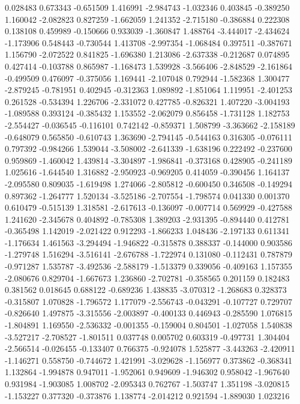 0.028483
0.673343
-0.651509
1.416991
-2.984743
-1.032346
0.403845
-0.389250
1.160042
-2.082823
0.827259
-1.662059
1.241352
-2.715180
-0.386884
0.222308
0.138108
0.459989
-0.150666
0.933039
-1.360847
1.488764
-3.444017
-2.434624
-1.173906
0.548443
-0.730544
1.413708
-2.997354
-1.068484
0.397511
-0.387671
1.156790
-2.072522
0.841825
-1.696380
1.213086
-2.637338
-0.212687
0.074895
0.427414
-0.103788
0.865987
-1.168473
1.539928
-3.566406
-2.848529
-2.161864
-0.499509
0.476097
-0.375056
1.169441
-2.107048
0.792944
-1.582368
1.300477
-2.879245
-0.781951
0.402945
-0.312363
1.089892
-1.851064
1.119951
-2.401253
0.261528
-0.534394
1.226706
-2.331072
0.427785
-0.826321
1.407220
-3.004193
-1.089588
0.393124
-0.385432
1.153552
-2.062079
0.856458
-1.731128
1.182753
-2.554427
-0.036545
-0.116101
0.742142
-0.859371
1.508799
-3.363662
-2.158189
-0.648079
0.565850
-0.610743
1.363690
-2.794145
-0.544163
0.316305
-0.076111
0.797392
-0.984266
1.539044
-3.508002
-2.641339
-1.638196
0.222492
-0.237600
0.959869
-1.460042
1.439814
-3.304897
-1.986841
-0.373168
0.428905
-0.241189
1.025616
-1.644540
1.316882
-2.950923
-0.969205
0.414059
-0.390456
1.164137
-2.095580
0.809035
-1.619498
1.274066
-2.805812
-0.600450
0.346508
-0.149294
0.897362
-1.264777
1.520134
-3.525186
-2.707554
-1.798574
0.041330
0.001370
0.610479
-0.515139
1.318581
-2.617613
-0.136097
-0.007714
0.569929
-0.427588
1.241620
-2.345678
0.404892
-0.785308
1.389203
-2.931395
-0.894440
0.412781
-0.365498
1.142019
-2.021422
0.912293
-1.866233
1.048436
-2.197133
0.611341
-1.176634
1.461563
-3.294494
-1.946822
-0.315878
0.388337
-0.144000
0.903586
-1.279748
1.516294
-3.516141
-2.676788
-1.722974
0.131080
-0.112431
0.787879
-0.971287
1.535787
-3.492536
-2.588179
-1.513379
0.339056
-0.409163
1.157355
-2.080676
0.829704
-1.667673
1.236860
-2.702781
-0.358565
0.201159
0.182483
0.381562
0.018645
0.688122
-0.689236
1.438835
-3.070312
-1.268683
0.328373
-0.315807
1.070828
-1.796572
1.177079
-2.556743
-0.043291
-0.107727
0.729707
-0.826640
1.497875
-3.315556
-2.003897
-0.400133
0.446943
-0.285590
1.076815
-1.804891
1.169550
-2.536332
-0.001355
-0.159004
0.804501
-1.027058
1.540838
-3.527217
-2.708527
-1.801511
0.037748
0.005702
0.603319
-0.497731
1.304404
-2.566514
-0.026455
-0.133407
0.766375
-0.924078
1.525877
-3.443263
-2.420911
-1.146271
0.558750
-0.744672
1.421991
-3.029628
-1.156977
0.373862
-0.368341
1.132864
-1.994878
0.947011
-1.952061
0.949609
-1.946302
0.958042
-1.967640
0.931984
-1.903085
1.008702
-2.095343
0.762767
-1.503747
1.351198
-3.020815
-1.153227
0.377320
-0.373876
1.138774
-2.014212
0.921594
-1.889030
1.023216
